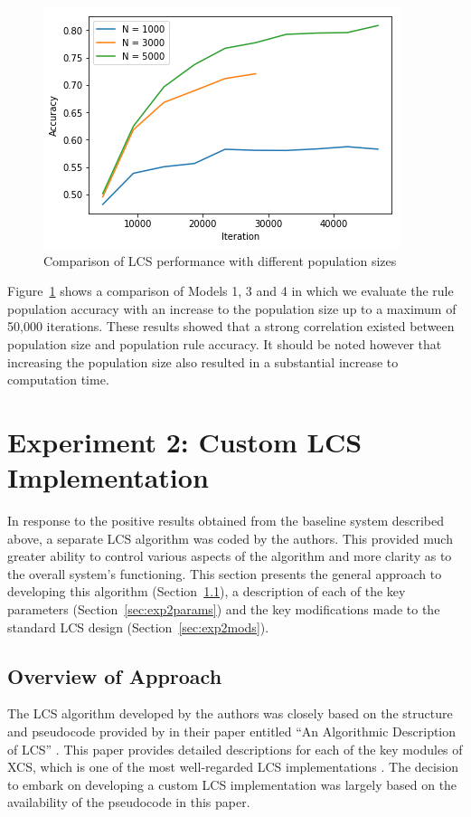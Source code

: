 \documentclass[11pt]{article}
\begin{document}
\begin{figure}[!htbp]
	\centering
	\includegraphics[width=0.5\linewidth]{figures/bs-plot-2.png}
	\caption{Comparison of LCS performance with different population sizes}
	\label{fig:diffPopSize}
\end{figure}

Figure~\ref{fig:diffPopSize} shows a comparison of Models 1, 3 and 4 in which we evaluate the rule population accuracy with an increase to the population size up to a maximum of 50,000 iterations. These results showed that a strong correlation existed between population size and population rule accuracy. It should be noted however that increasing the population size also resulted in a substantial increase to computation time.






\pagebreak
\section{Experiment 2: Custom LCS Implementation}
\label{sec:exp2}

In response to the positive results obtained from the baseline system described above, a separate LCS algorithm was coded by the authors. This provided much greater ability to control various aspects of the algorithm and more clarity as to the overall system's functioning. This section presents the general approach to developing this algorithm (Section~\ref{sec:exp2appr}), a description of each of the key parameters (Section~\ref{sec:exp2params}) and the key modifications made to the standard LCS design (Section~\ref{sec:exp2mods}).





\subsection{Overview of Approach}
\label{sec:exp2appr}

The LCS algorithm developed by the authors was closely based on the structure and pseudocode provided by \citeauthor{Butz2000} in their paper entitled ``An Algorithmic Description of LCS'' \cite{Butz2000}. This paper provides detailed descriptions for each of the key modules of XCS, which is one of the most well-regarded LCS implementations \cite{Sigaud2007}. The decision to embark on developing a custom LCS implementation was largely based on the availability of the pseudocode in this paper.
\end{document}
